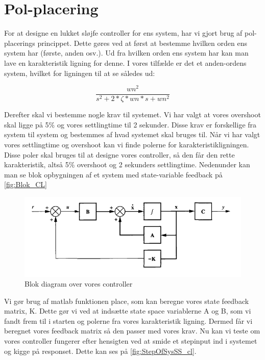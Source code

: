\graphicspath{{Chapters/Pol-placering/}}

\section{Pol-placering}
For at designe en lukket sløjfe controller for ens system, har vi gjort brug af pol-placerings princippet. Dette gøres ved at først at bestemme hvilken orden ens system har (første, anden osv.). Ud fra hvilken orden ens system har kan man lave en karakteristik ligning for denne. I vores tilfælde er det et anden-ordens system, hvilket for ligningen til at se således ud:

\begin{equation}
 \frac{wn^2}{s^2+2*\zeta*wn*s+wn^2}
\end{equation}


Derefter skal vi bestemme nogle krav til systemet. Vi har valgt at vores overshoot skal ligge på 5\% og vores settlingtime til 2 sekunder. Disse krav er forskellige fra system til system og bestemmes af hvad systemet skal bruges til. Når vi har valgt vores settlingtime og overshoot kan vi finde polerne for karakteristikligningen. Disse poler skal bruges til at designe vores controller, så den får den rette karakteristik, altså 5\% overshoot og 2 sekunders settlingtime. Nedenunder kan man se blok opbygningen af et system med state-variable feedback på \autoref{fig:Blok_CL}

\begin{figure}[H]
	\centering
	\includegraphics[width = 400pt]{Img/Controller_blok.png}
	\caption{Blok diagram over vores controller}
	\label{fig:Blok_CL}
\end{figure}

Vi gør brug af matlab funktionen place, som kan beregne vores state feedback matrix, K. Dette gør vi ved at indsætte state space variablerne A og B, som vi fandt frem til i starten og polerne fra vores karakteristik ligning. Dermed får vi beregnet vores feedback matrix så den passer med vores krav.
Nu kan vi teste om vores controller fungerer efter hensigten ved at smide et stepinput ind i systemet og kigge på responset. Dette kan ses på \autoref{fig:StepOfSysSS_cl}.  

